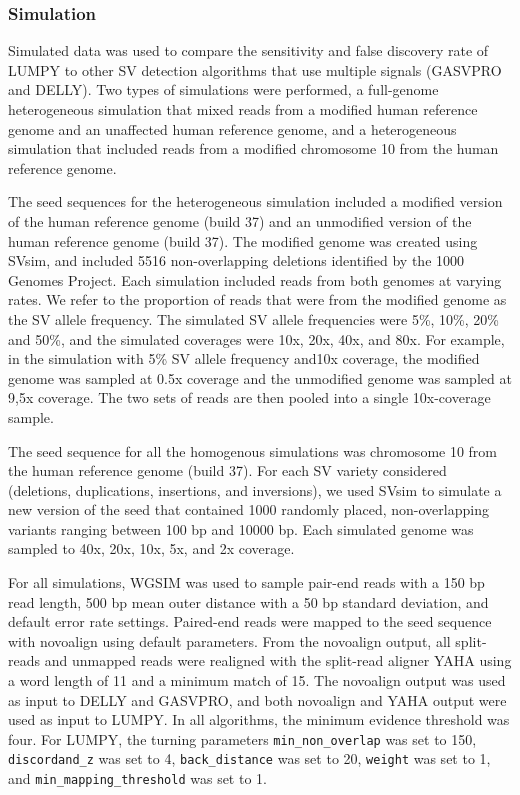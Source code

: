 \documentclass[10pt]{bmc_article}
\newenvironment{bmcformat}{\begin{raggedright}\baselineskip20pt\sloppy\setboolean{publ}{false}}{\end{raggedright}\baselineskip20pt\sloppy}
\begin{document}
\begin{bmcformat}
\subsubsection*{Simulation}
Simulated data was used to compare the sensitivity and false discovery rate of
LUMPY to other SV detection algorithms that use multiple signals (GASVPRO and
DELLY).   Two types of simulations were performed, a full-genome heterogeneous
simulation that mixed reads from a modified human reference genome and an
unaffected human reference genome, and a heterogeneous simulation that included
reads from a modified chromosome 10 from the human reference genome.

The seed sequences for the heterogeneous simulation included a modified version
of the human reference genome (build 37) and an unmodified version of the human
reference genome (build 37).  The modified genome was created using SVsim, and
included 5516 non-overlapping deletions identified by the 1000 Genomes Project.
Each simulation included reads from both genomes at varying rates.  We refer to
the proportion of reads that were from the modified genome as the SV allele
frequency.  The simulated SV allele frequencies were 5\%, 10\%, 20\% and 50\%,
and the simulated coverages were 10x, 20x, 40x, and 80x.  For example, in the
simulation with 5\% SV allele frequency and10x coverage, the modified genome was
sampled at 0.5x coverage and the unmodified genome was sampled at 9,5x coverage.
The two sets of reads are then pooled into a single 10x-coverage sample.

The seed sequence for all the homogenous simulations was chromosome 10 from the
human reference genome (build 37). For each SV variety considered (deletions,
duplications, insertions, and inversions), we used SVsim to simulate a new
version of the seed that contained 1000 randomly placed, non-overlapping
variants ranging between 100 bp and 10000 bp. Each simulated genome was sampled
to 40x, 20x, 10x, 5x, and 2x coverage.

For all simulations, WGSIM was used to sample pair-end reads with a 150 bp read
length, 500 bp mean outer distance with a 50 bp standard deviation, and default
error rate settings.  Paired-end reads were mapped to the seed sequence with
novoalign using default parameters. From the novoalign output, all split-reads
and unmapped reads were realigned with the split-read aligner YAHA using a word
length of 11 and a minimum match of 15. The novoalign output was used as input
to DELLY and GASVPRO, and both novoalign and YAHA output were used as input to
LUMPY. In all algorithms, the minimum evidence threshold was four. For LUMPY,
the turning parameters {\tt min\_non\_overlap} was set to 150, 
{\tt discordand\_z} was set to 4, {\tt back\_distance} was set to 20, 
{\tt weight} was set to 1, and {\tt min\_mapping\_threshold} was set to 1.


\end{bmcformat}
\end{document}
